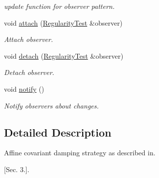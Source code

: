 \begin{DoxyCompactItemize}
\begin{DoxyCompactList}\small\item\em update function for observer pattern. \end{DoxyCompactList}\item 
\hypertarget{classSpacy_1_1Mixin_1_1MixinConnection_abb5520ee6b22dd993d78f142939a1ed4}{void \hyperlink{classSpacy_1_1Mixin_1_1MixinConnection_abb5520ee6b22dd993d78f142939a1ed4}{attach} (\hyperlink{classSpacy_1_1Mixin_1_1RegularityTest_a548d9d45c31c7833266bd3b20dc1aa7e}{\-Regularity\-Test} \&observer)}\label{classSpacy_1_1Mixin_1_1MixinConnection_abb5520ee6b22dd993d78f142939a1ed4}

\begin{DoxyCompactList}\small\item\em \-Attach observer. \end{DoxyCompactList}\item 
\hypertarget{classSpacy_1_1Mixin_1_1MixinConnection_adda739590c487679c26f60e50aedb73f}{void \hyperlink{classSpacy_1_1Mixin_1_1MixinConnection_adda739590c487679c26f60e50aedb73f}{detach} (\hyperlink{classSpacy_1_1Mixin_1_1RegularityTest_a548d9d45c31c7833266bd3b20dc1aa7e}{\-Regularity\-Test} \&observer)}\label{classSpacy_1_1Mixin_1_1MixinConnection_adda739590c487679c26f60e50aedb73f}

\begin{DoxyCompactList}\small\item\em \-Detach observer. \end{DoxyCompactList}\item 
\hypertarget{classSpacy_1_1Mixin_1_1MixinConnection_a1ddeaa78a3bb4a38c2cca36d1f99fe36}{void \hyperlink{classSpacy_1_1Mixin_1_1MixinConnection_a1ddeaa78a3bb4a38c2cca36d1f99fe36}{notify} ()}\label{classSpacy_1_1Mixin_1_1MixinConnection_a1ddeaa78a3bb4a38c2cca36d1f99fe36}

\begin{DoxyCompactList}\small\item\em \-Notify observers about changes. \end{DoxyCompactList}\end{DoxyCompactItemize}


\subsection{\-Detailed \-Description}
\-Affine covariant damping strategy as described in. 

\cite{Deuflhard2004} \mbox{[}\-Sec. 3.\mbox{]}. 

